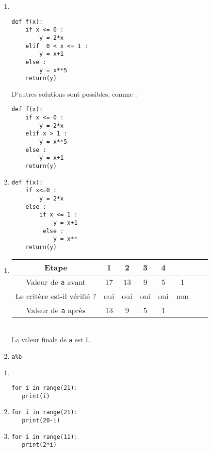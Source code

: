 \begin{solution}
\begin{enumerate}
\item ~\\
\vspace{-0.7cm}
\begin{verbatim}
def f(x):
    if x <= 0 :
        y = 2*x
    elif  0 < x <= 1 :
        y = x+1
    else :     
        y = x**5
    return(y)   
\end{verbatim}
D'autres solutions sont possibles, comme :
\begin{verbatim}
def f(x):
    if x <= 0 :
        y = 2*x
    elif x > 1 :
        y = x**5
    else :     
        y = x+1
    return(y)   
\end{verbatim}
\item 
\begin{verbatim}
def f(x):
    if x<=0 :
        y = 2*x
    else :    
        if x <= 1 :
            y = x+1
         else :
            y = x**
    return(y)   
\end{verbatim}
\end{enumerate}
\end{solution}
\bigskip


\begin{solution}
\begin{enumerate}
\item 
\begin{tabular}{c|c|c|c|c|c|c|c|}
Etape &  1 &2&3 &4 &\\
\hline
Valeur de \verb?a?  avant  & 17 & 13 & 9 & 5 &1\\
Le critère est-il vérifié ? & oui & oui & oui & oui & non \\
Valeur de \verb?a? après & 13 & 9 & 5 & 1 
\end{tabular}\\
La valeur finale de \verb?a? est 1.
\item \verb?a%b?
\end{enumerate} 
\end{solution}
\bigskip


\begin{solution}
\begin{enumerate}
\item ~\\
\vspace{-0.7cm}
\begin{verbatim}
for i in range(21):
   print(i)
\end{verbatim}
\item 
\begin{verbatim}
for i in range(21):
   print(20-i)
\end{verbatim}
 \item 
\begin{verbatim}
for i in range(11):
   print(2*i)
\end{verbatim}
\end{enumerate} 
\end{solution}
 \bigskip
 

